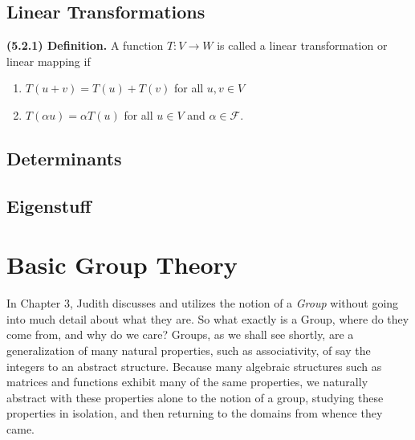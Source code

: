 \documentclass[12pt]{book}
\def\cF{{\mathcal{F}}}
\begin{document}
\section{Linear Transformations}


\noindent\textbf{(5.2.1) Definition.} A function $T\colon V\rightarrow W$ is called a linear transformation or linear mapping if 
\begin{enumerate}
\item $T(u+v)=T(u)+T(v)$ for all $u,v\in V$
\item $T(\alpha u)=\alpha T(u)$ for all $u\in V$ and $\alpha\in\cF$.
\end{enumerate}







\section{Determinants}





\section{Eigenstuff}






\chapter{Basic Group Theory}

In Chapter 3, Judith discusses and utilizes the notion of a \textit{Group} without going into much detail about what they are. So what exactly is a Group, where do they come from, and why do we care? Groups, as we shall see shortly, are a generalization of many natural properties, such as associativity, of say the integers to an abstract structure. Because many algebraic structures such as matrices and functions exhibit many of the same properties, we naturally abstract with these properties alone to the notion of a group, studying these properties in isolation, and then returning to the domains from whence they came.\\
\end{document}
